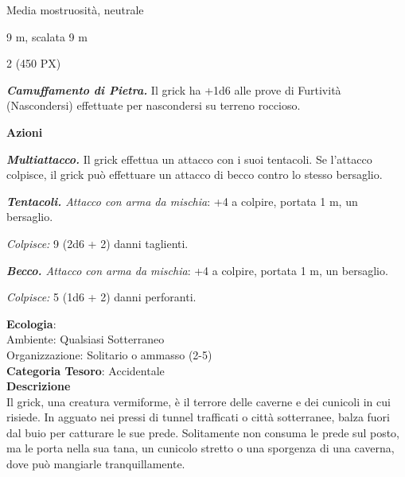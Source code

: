 \begin{multicols}{2}
{
\begin{description}[noitemsep, topsep=0pt, parsep=0pt, partopsep=0pt, itemsep=1pt, leftmargin=2.35cm,  labelwidth=2.2cm, itemindent=0cm, listparindent=0pt] %
\setlength{\baselineskip}{10pt}
\item[\textbf{Taglia/Tipo}] Media mostruosità, neutrale
\item[\textbf{Caratt.}] 
\item[\textbf{Punti Ferita}] 
\item[\textbf{Movimento}] 9 m, scalata 9 m
\item[\textbf{Tiri Salvez.}] 
\item[\textbf{Sensi}] 
\item[\textbf{Sfida}] 2 (450 PX)
\end{description}
\smallskip

\emph{\textbf{Camuffamento di Pietra.}} Il grick ha +1d6 alle prove di Furtività (Nascondersi) effettuate per nascondersi su terreno roccioso.

\textbf{Azioni}

\emph{\textbf{Multiattacco.}} Il grick effettua un attacco con i suoi tentacoli. Se l'attacco colpisce, il grick può effettuare un attacco di becco contro lo stesso bersaglio.

\emph{\textbf{Tentacoli.} Attacco con arma da mischia}: +4 a colpire, portata 1 m, un bersaglio.

\emph{Colpisce:} 9 (2d6 + 2) danni taglienti.

\emph{\textbf{Becco.} Attacco con arma da mischia}: +4 a colpire, portata 1 m, un bersaglio.

\emph{Colpisce:} 5 (1d6 + 2) danni perforanti.

\textbf{Ecologia}: \\
Ambiente: Qualsiasi Sotterraneo\\
Organizzazione: Solitario o ammasso (2-5)\\
\textbf{Categoria Tesoro}: Accidentale\\
\textbf{Descrizione}\\
Il grick, una creatura vermiforme, è il terrore delle caverne e dei cunicoli in cui risiede. In agguato nei pressi di tunnel trafficati o città sotterranee, balza fuori dal buio per catturare le sue prede. Solitamente non consuma le prede sul posto, ma le porta nella sua tana, un cunicolo stretto o una sporgenza di una caverna, dove può mangiarle tranquillamente.

}
\end{multicols}

